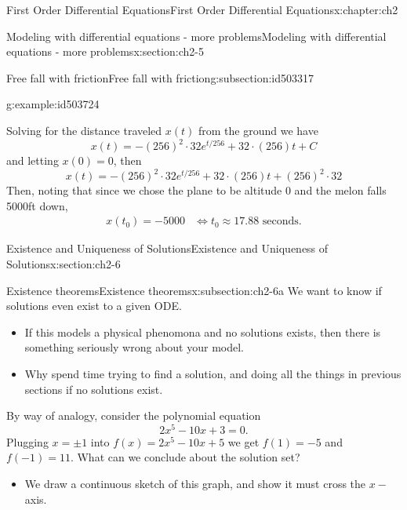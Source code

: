 \documentclass[oneside,10pt,]{book}
\numberwithin{equation}{section}
\numberwithin{equation}{section}
\newcommand{\amp}{&}
\begin{document}
\begin{chapterptx}{First Order Differential Equations}{}{First Order Differential Equations}{}{}{x:chapter:ch2}
\begin{sectionptx}{Modeling with differential equations - more problems}{}{Modeling with differential equations - more problems}{}{}{x:section:ch2-5}
\begin{subsectionptx}{Free fall with friction}{}{Free fall with friction}{}{}{g:subsection:id503317}
\begin{example}{}{g:example:id503724}
%
\par
Solving for the distance traveled \(x(t)\) from the ground we have%
\begin{equation*}
x(t)=-\left(256\right)^{2}\cdot32e^{t/256}+32\cdot\left(256\right)t+C
\end{equation*}
and letting \(x(0)=0\), then%
\begin{equation*}
x(t)=-\left(256\right)^{2}\cdot32e^{t/256}+32\cdot\left(256\right)t+\left(256\right)^{2}\cdot32
\end{equation*}
Then, noting that since we chose the plane to be altitude 0 and the melon falls 5000ft down,%
\begin{align*}
x(t_{0})=-5000 \amp \iff t_{0}\approx17.88\text{ seconds.}
\end{align*}
%
\end{example}
\end{subsectionptx}
\end{sectionptx}
%
%
\typeout{************************************************}
\typeout{************************************************}
%
\begin{sectionptx}{Existence and Uniqueness of Solutions}{}{Existence and Uniqueness of Solutions}{}{}{x:section:ch2-6}
%
%
\typeout{************************************************}
\typeout{************************************************}
%
\begin{subsectionptx}{Existence theorems}{}{Existence theorems}{}{}{x:subsection:ch2-6a}
We want to know if solutions even exist to a given ODE.%
%
\begin{itemize}[label=\textbullet]
\item{}If this models a physical phenomona and no solutions exists, then there is something seriously wrong about your model.%
\item{}Why spend time trying to find a solution, and doing all the things in previous sections if no solutions exist.%
\end{itemize}
By way of analogy, consider the polynomial equation%
\begin{equation*}
2x^{5}-10x+3=0.
\end{equation*}
Plugging \(x=\pm1\) into \(f(x)=2x^{5}-10x+5\) we get \(f(1)=-5\) and \(f(-1)=11\). What can we conclude about the solution set?%
%
\begin{itemize}[label=\textbullet]
\item{}We draw a continuous sketch of this graph, and show it must cross the \(x-\)axis.%

\end{itemize}
\end{subsectionptx}
\end{sectionptx}
\end{chapterptx}
\end{document}
